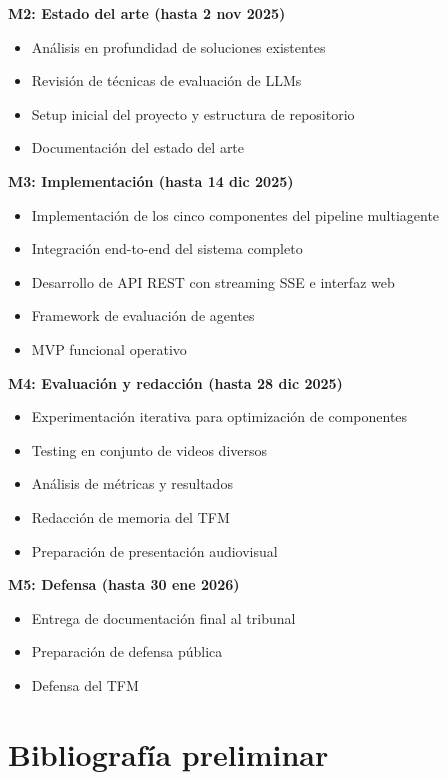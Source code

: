 \documentclass[12pt,a4paper]{article}
\begin{document}
\textbf{M2: Estado del arte (hasta 2 nov 2025)}
\begin{itemize}
    \item Análisis en profundidad de soluciones existentes
    \item Revisión de técnicas de evaluación de LLMs
    \item Setup inicial del proyecto y estructura de repositorio
    \item Documentación del estado del arte
\end{itemize}

\textbf{M3: Implementación (hasta 14 dic 2025)}
\begin{itemize}
    \item Implementación de los cinco componentes del pipeline multiagente
    \item Integración end-to-end del sistema completo
    \item Desarrollo de API REST con streaming SSE e interfaz web
    \item Framework de evaluación de agentes
    \item MVP funcional operativo
\end{itemize}

\textbf{M4: Evaluación y redacción (hasta 28 dic 2025)}
\begin{itemize}
    \item Experimentación iterativa para optimización de componentes
    \item Testing en conjunto de videos diversos
    \item Análisis de métricas y resultados
    \item Redacción de memoria del TFM
    \item Preparación de presentación audiovisual
\end{itemize}

\textbf{M5: Defensa (hasta 30 ene 2026)}
\begin{itemize}
    \item Entrega de documentación final al tribunal
    \item Preparación de defensa pública
    \item Defensa del TFM
\end{itemize}

\section{Bibliografía preliminar}

\nocite{*}


\end{document}
